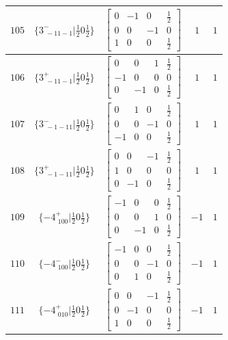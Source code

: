\documentclass[fleqn,8pt]{jsarticle}
\begin{document}
\begin{longtable}{ccccc}
$ 105 $ & $ \{3^{-}_{\,\,-11-1}|\frac{1}{2} 0 \frac{1}{2}\} $ & $ \begin{bmatrix} 0 & -1 & 0 & \frac{1}{2} \\ 0 & 0 & -1 & 0 \\ 1 & 0 & 0 & \frac{1}{2} \end{bmatrix} $ & $ 1 $ & $ 1 $ \\ \hline
$ 106 $ & $ \{3^{+}_{\,\,-11-1}|\frac{1}{2} 0 \frac{1}{2}\} $ & $ \begin{bmatrix} 0 & 0 & 1 & \frac{1}{2} \\ -1 & 0 & 0 & 0 \\ 0 & -1 & 0 & \frac{1}{2} \end{bmatrix} $ & $ 1 $ & $ 1 $ \\ \hline
$ 107 $ & $ \{3^{-}_{\,\,-1-11}|\frac{1}{2} 0 \frac{1}{2}\} $ & $ \begin{bmatrix} 0 & 1 & 0 & \frac{1}{2} \\ 0 & 0 & -1 & 0 \\ -1 & 0 & 0 & \frac{1}{2} \end{bmatrix} $ & $ 1 $ & $ 1 $ \\ \hline
$ 108 $ & $ \{3^{+}_{\,\,-1-11}|\frac{1}{2} 0 \frac{1}{2}\} $ & $ \begin{bmatrix} 0 & 0 & -1 & \frac{1}{2} \\ 1 & 0 & 0 & 0 \\ 0 & -1 & 0 & \frac{1}{2} \end{bmatrix} $ & $ 1 $ & $ 1 $ \\ \hline
$ 109 $ & $ \{-4^{+}_{\,\,100}|\frac{1}{2} 0 \frac{1}{2}\} $ & $ \begin{bmatrix} -1 & 0 & 0 & \frac{1}{2} \\ 0 & 0 & 1 & 0 \\ 0 & -1 & 0 & \frac{1}{2} \end{bmatrix} $ & $ -1 $ & $ 1 $ \\ \hline
$ 110 $ & $ \{-4^{-}_{\,\,100}|\frac{1}{2} 0 \frac{1}{2}\} $ & $ \begin{bmatrix} -1 & 0 & 0 & \frac{1}{2} \\ 0 & 0 & -1 & 0 \\ 0 & 1 & 0 & \frac{1}{2} \end{bmatrix} $ & $ -1 $ & $ 1 $ \\ \hline
$ 111 $ & $ \{-4^{+}_{\,\,010}|\frac{1}{2} 0 \frac{1}{2}\} $ & $ \begin{bmatrix} 0 & 0 & -1 & \frac{1}{2} \\ 0 & -1 & 0 & 0 \\ 1 & 0 & 0 & \frac{1}{2} \end{bmatrix} $ & $ -1 $ & $ 1 $ \\ \hline

\end{longtable}
\end{document}
